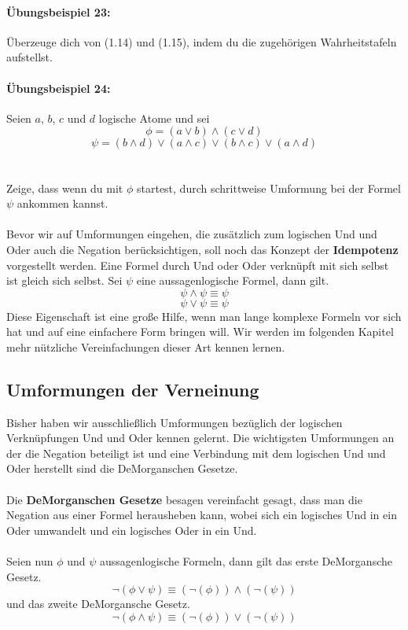 \documentclass[11pt,a4paper,leqno]{report}
\numberwithin{equation}{chapter}
\begin{document}
\paragraph{Übungsbeispiel 23:} Überzeuge dich von (1.14) und (1.15), indem du die zugehörigen Wahrheitstafeln aufstellst.
\paragraph{Übungsbeispiel 24:} Seien $a$, $b$, $c$ und $d$ logische Atome und sei 
$$\phi = (a\vee b)\wedge(c\vee d)$$
$$\psi = (b\wedge d)\vee(a\wedge c)\vee(b\wedge c)\vee(a\wedge d)$$
\\
\\
Zeige, dass wenn du mit $\phi$ startest, durch schrittweise Umformung bei der Formel $\psi$ ankommen kannst.\\
\\
Bevor wir auf Umformungen eingehen, die zusätzlich zum logischen Und und Oder auch die Negation berücksichtigen, soll noch das Konzept der \textbf{Idempotenz} vorgestellt werden. Eine Formel durch Und oder Oder verknüpft mit sich selbst ist gleich sich selbst. Sei $\psi$ eine aussagenlogische Formel, dann gilt.
\begin{equation}
	\psi\wedge\psi\equiv\psi
\end{equation}
\begin{equation}
\psi\vee\psi\equiv\psi
\end{equation}
Diese Eigenschaft ist eine große Hilfe, wenn man lange komplexe Formeln vor sich hat und auf eine einfachere Form bringen will. Wir werden im folgenden Kapitel mehr nützliche Vereinfachungen dieser Art kennen lernen.
\subsection{Umformungen der Verneinung}
Bisher haben wir ausschließlich Umformungen bezüglich der logischen Verknüpfungen Und und Oder kennen gelernt. Die wichtigsten Umformungen an der die Negation beteiligt ist und eine Verbindung mit dem logischen Und und Oder herstellt sind die DeMorganschen Gesetze.\\
\\
Die \textbf{DeMorganschen Gesetze} besagen vereinfacht gesagt, dass man die Negation aus einer Formel herausheben kann, wobei sich ein logisches Und in ein Oder umwandelt und ein logisches Oder in ein Und.\\
\\
Seien nun $\phi$ und $\psi$ aussagenlogische Formeln, dann gilt das erste DeMorgansche Gesetz.
\begin{equation}
	\neg(\phi\vee\psi)\equiv(\neg(\phi))\wedge(\neg(\psi))
\end{equation}
und das zweite DeMorgansche Gesetz.
\begin{equation}
\neg(\phi\wedge\psi)\equiv(\neg(\phi))\vee(\neg(\psi))
\end{equation}
\end{document}
